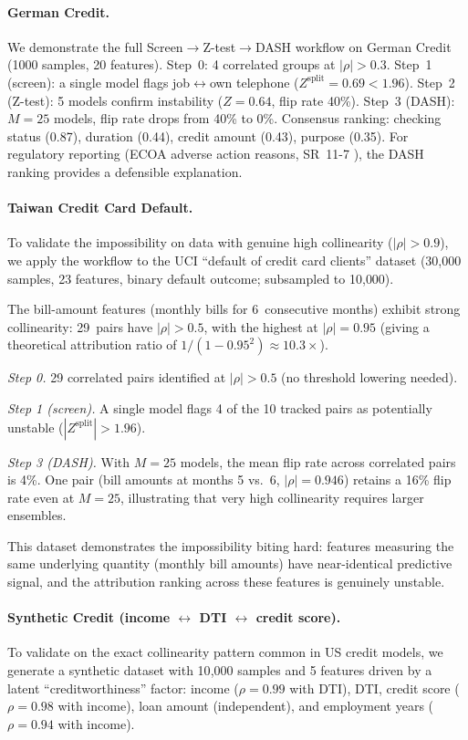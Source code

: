 \documentclass{article}
\begin{document}
\paragraph{German Credit.}
We demonstrate the full Screen$\to$Z-test$\to$DASH workflow on German Credit (1000 samples, 20 features). Step~0: 4 correlated groups at $|\rho| > 0.3$. Step~1 (screen): a single model flags job$\leftrightarrow$own telephone ($Z^{\text{split}} = 0.69 < 1.96$). Step~2 (Z-test): 5 models confirm instability ($Z = 0.64$, flip rate 40\%). Step~3 (DASH): $M = 25$ models, flip rate drops from 40\% to 0\%. Consensus ranking: checking status (0.87), duration (0.44), credit amount (0.43), purpose (0.35). For regulatory reporting (ECOA adverse action reasons, SR~11-7 \citep{occ2011sr117}), the DASH ranking provides a defensible explanation.

\paragraph{Taiwan Credit Card Default.}
To validate the impossibility on data with genuine high collinearity
($|\rho| > 0.9$), we apply the workflow to the UCI ``default of credit
card clients'' dataset (30{,}000 samples, 23 features, binary default
outcome; subsampled to 10{,}000).

The bill-amount features (monthly bills for 6~consecutive months)
exhibit strong collinearity: 29~pairs have $|\rho| > 0.5$, with the
highest at $|\rho| = 0.95$ (giving a theoretical attribution ratio of
$1/(1{-}0.95^2) \approx 10.3\times$).

\emph{Step 0.} 29 correlated pairs identified at $|\rho| > 0.5$
(no threshold lowering needed).

\emph{Step 1 (screen).} A single model flags 4 of the 10 tracked pairs
as potentially unstable ($|Z^{\text{split}}| > 1.96$).

\emph{Step 3 (DASH).} With $M = 25$ models, the mean flip rate
across correlated pairs is 4\%. One pair (bill amounts at months 5
vs.\ 6, $|\rho| = 0.946$) retains a 16\% flip rate even at $M = 25$,
illustrating that very high collinearity requires larger ensembles.

This dataset demonstrates the impossibility biting hard: features
measuring the same underlying quantity (monthly bill amounts) have
near-identical predictive signal, and the attribution ranking across
these features is genuinely unstable.

\paragraph{Synthetic Credit (income $\leftrightarrow$ DTI $\leftrightarrow$ credit score).}
To validate on the exact collinearity pattern common in US credit
models, we generate a synthetic dataset with 10{,}000 samples and
5 features driven by a latent ``creditworthiness'' factor:
income ($\rho = 0.99$ with DTI), DTI, credit score ($\rho = 0.98$
with income), loan amount (independent), and employment years
($\rho = 0.94$ with income).
\end{document}
